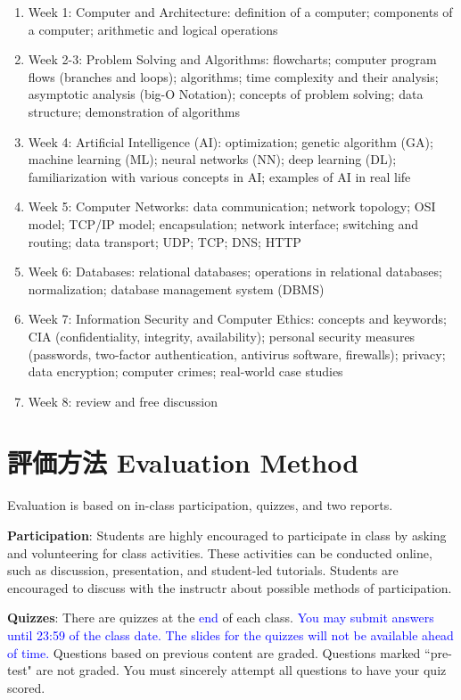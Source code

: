 \documentclass{article}
\begin{document}
\begin{enumerate}
    \item Week 1: Computer and Architecture: definition of a computer; components of a computer; arithmetic and logical operations
    \item Week 2-3: Problem Solving and Algorithms: flowcharts; computer program flows (branches and loops); algorithms; time complexity and their analysis; asymptotic analysis (big-O Notation); concepts of problem solving; data structure; demonstration of algorithms
    \item Week 4: Artificial Intelligence (AI): optimization; genetic algorithm (GA); machine learning (ML); neural networks (NN); deep learning (DL); familiarization with various concepts in AI; examples of AI in real life
    \item Week 5: Computer Networks: data communication; network topology; OSI model; TCP/IP model; encapsulation; network interface; switching and routing; data transport; UDP; TCP; DNS; HTTP
    \item Week 6: Databases: relational databases; operations in relational databases; normalization; database management system (DBMS)
    \item Week 7: Information Security and Computer Ethics: concepts and keywords; CIA (confidentiality, integrity, availability); personal security measures (passwords, two-factor authentication, antivirus software, firewalls); privacy; data encryption; computer crimes; real-world case studies
    \item Week 8: review and free discussion
\end{enumerate}

\section{評価方法 Evaluation Method}
Evaluation is based on in-class participation, quizzes, and two reports.

\smallskip\noindent
\textbf{Participation}: Students are highly encouraged to participate in class by asking and volunteering for class activities. These activities can be conducted online, such as discussion, presentation, and student-led tutorials. Students are encouraged to discuss with the instructr about possible methods of participation.

\smallskip\noindent
\textbf{Quizzes}: There are quizzes at the \textcolor{blue}{end} of each class. \textcolor{blue}{You may submit answers until 23:59 of the class date. The slides for the quizzes will not be available ahead of time.} Questions based on previous content are graded. Questions marked ``pre-test" are not graded. You must sincerely attempt all questions to have your quiz scored.
\end{document}

